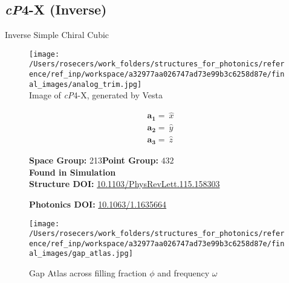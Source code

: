 \subsection{\large{\textit{cP}4-X (Inverse)}}\vspace{-0.1in}
Inverse Simple Chiral Cubic


\begin{figure}[H]
\begin{minipage}{0.34\textwidth}\centering
\texttt{[image: /Users/rosecers/work\_folders/structures\_for\_photonics/reference/ref\_inp/workspace/a32977aa026747ad73e99b3c6258d87e/final\_images/analog\_trim.jpg]}\\
\small{Image of \textit{cP}4-X, generated by Vesta}
\end{minipage}\hfill
\begin{minipage}{0.65\textwidth}\raggedright
{\setlength{\mathindent}{0cm}
\begin{equation*}
\begin{split}&\boldsymbol{a_1} = \ \hat{x}\\[-8pt]
&\boldsymbol{a_2} = \ \hat{y}\\[-8pt]
&\boldsymbol{a_3} = \ \hat{z}
\end{split}
\end{equation*}}

\textbf{Space Group:}	213\hspace{0.5in}\textbf{Point Group:}	$432$\\
\textbf{Found in Simulation}\\
\textbf{Structure DOI: }\url{10.1103/PhysRevLett.115.158303}

\textbf{Photonics DOI: }\url{10.1063/1.1635664}
\end{minipage}\hfill
\end{figure}
\vspace{-0.25in}


\begin{figure}[H]
\begin{minipage}{0.9\textwidth}\centering
\texttt{[image: /Users/rosecers/work\_folders/structures\_for\_photonics/reference/ref\_inp/workspace/a32977aa026747ad73e99b3c6258d87e/final\_images/gap\_atlas.jpg]}
\\
\end{minipage}\hfill\caption{Gap Atlas across filling fraction $\phi$ and frequency $\omega$}
\end{figure}


